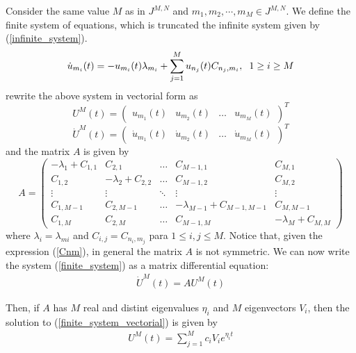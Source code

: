      \noindent Consider the same value $M$ as in $J^{M, N}$ and $m_1, m_2, \cdots, m_M \in J^{M, N}$. We define the finite system of equations, which is truncated the infinite system given by (\ref{infinite_system}).
    \begin{align}
    \label{finite_system}
    	\dot{u}_{m_i} (t) = -u_{m_i} (t) \lambda_{m_i} + \displaystyle \sum_{j=1}^{M} u_{n_j} (t) C_{n_j, m_i} , \hspace{2mm} 1 \geq i \geq M	
    \end{align}
    rewrite the above system in vectorial form as
    \begin{equation*}
    	U^M (t) =
    	\begin{pmatrix}
    		u_{m_1} (t) & u_{m_2} (t) & \dots & u_{m_M} (t)
    	\end{pmatrix}^T   
    \end{equation*}
    \begin{equation*}
    	\dot{U}^M (t) =
    	\begin{pmatrix}
    		\dot{u}_{m_1} (t) & \dot{u}_{m_2} (t) & \dots & \dot{u}_{m_M} (t)
    	\end{pmatrix}^T   
    \end{equation*}
   and the matrix $A$ is given by
    \begin{equation*}
   		A =
   		\begin{pmatrix}
	    	-\lambda_1 + C_{1,1} & C_{2,1} & \dots & C_{M-1,1} & C_{M,1} 
		    \\
		    C_{1,2} & -\lambda_2 + C_{2,2} & \dots & C_{M-1,2} & C_{M,2}  
		    \\
		    \vdots & \vdots & \ddots & \vdots & \vdots
		    \\
		    C_{1,M-1} & C_{2,M-1} & \dots & -\lambda_{M-1} + C_{M-1,M-1} & C_{M,M-1} 
		    \\
		    C_{1,M} & C_{2,M} & \dots & C_{M-1,M} & -\lambda_{M} + C_{M,M} 
	    \end{pmatrix}
    \end{equation*}
    where $\lambda_i = \lambda_{mi}$ and $C_{i, j} = C_{n_i, m_j}$ para $1 \leq i, j \leq M$. Notice that, given the
    expression (\ref{Cnm}), in general the matrix $A$ is not symmetric. We can now write the system (\ref{finite_system}) as a matrix differential equation:
    \begin{align}
    	\label{finite_system_vectorial}
    	\dot{U}^M (t) = AU^M (t)
    \end{align}
    
    \noindent Then, if $A$ has $M$ real and distint eigenvalues $\eta_i$ and $M$ eigenvectors $V_i$, then the solution to (\ref{finite_system_vectorial}) is given by
    \begin{align}
    \label{solution_finite_system}
    	 U^M (t) = \displaystyle \sum _{j = 1}^{M} c_i V_i e^{\eta_i t}
    \end{align}
    
